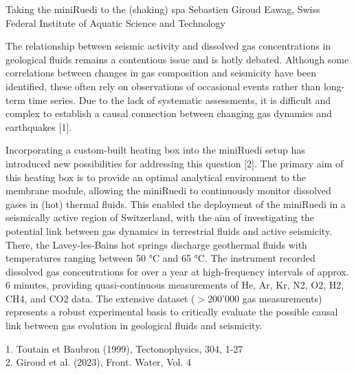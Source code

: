 \begin{conf-abstract}
{Taking the miniRuedi to the (shaking) spa}
{Sebastien Giroud}
{Eawag, Swiss Federal Institute of Aquatic Science and Technology}
{The relationship between seismic activity and dissolved gas concentrations in geological fluids remains a contentious issue and is hotly debated. Although some correlations between changes in gas composition and seismicity have been identified, these often rely on observations of occasional events rather than long-term time series. Due to the lack of systematic assessments, it is difficult and complex to establish a causal connection between changing gas dynamics and earthquakes [1].

Incorporating a custom-built heating box into the miniRuedi setup has introduced new possibilities for addressing this question [2]. The primary aim of this heating box is to provide an optimal analytical environment to the membrane module, allowing the miniRuedi to continuously monitor dissolved gases in (hot) thermal fluids. This enabled the deployment of the miniRuedi in a seismically active region of Switzerland, with the aim of investigating the potential link between gas dynamics in terrestrial fluids and active seismicity. There, the Lavey-les-Bains hot springs discharge geothermal fluids with temperatures ranging between 50 °C and 65 °C. The instrument recorded dissolved gas concentrations for over a year at high-frequency intervals of approx. 6 minutes, providing quasi-continuous measurements of He, Ar, Kr, N2, O2, H2, CH4, and CO2 data. The extensive dataset ($>$200’000 gas measurements) represents a robust experimental basis to critically evaluate the possible causal link between gas evolution in geological fluids and seismicity.

1. Toutain et Baubron (1999), Tectonophysics, 304, 1-27\\
2. Giroud et al. (2023), Front. Water, Vol. 4}
\end{conf-abstract}
